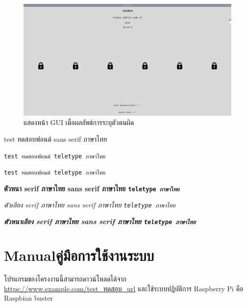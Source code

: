 \begin{figure}[!ht]
    \begin{center}
      \includegraphics[scale=.4]{pic/comfirm_page.png}
      \caption[wrong predict]{แสดงหน้า GUI เมื่อผลลัพธ์การระบุตัวตนผิด}
      \label{fig:com_page}
    \end{center}
  \end{figure}



\newpage

\textsf{test ทดสอบฟอนต์ sans serif ภาษาไทย}

\verb+test ทดสอบฟอนต์ teletype ภาษาไทย+

\texttt{test ทดสอบฟอนต์ teletype ภาษาไทย}

\textbf{ตัวหนา serif ภาษาไทย \textsf{sans serif ภาษาไทย} \texttt{teletype ภาษาไทย}}

\textit{ตัวเอียง serif ภาษาไทย \textsf{sans serif ภาษาไทย} \texttt{teletype ภาษาไทย}}

\textbf{\textit{ตัวหนาเอียง serif ภาษาไทย \textsf{sans serif ภาษาไทย} \texttt{teletype ภาษาไทย}}}






\chapter{\ifenglish Manual\else คู่มือการใช้งานระบบ\fi}

โปรแกรมของโครงงานนี้สามารถดาวน์โหลดได้จาก \url{https://www.example.com/test_ทดสอบ_url} และใช้ระบบปฏิบัติการ Raspberry Pi คือ Raspbian buster


